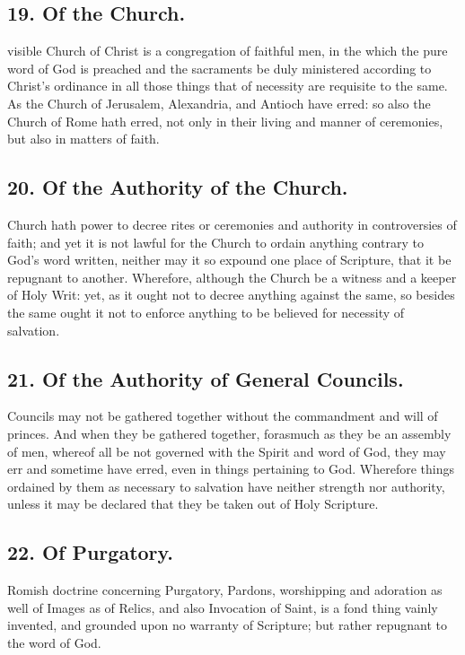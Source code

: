 \subsection{19. Of the Church.}
 visible Church of Christ is a congregation of faithful men, in the which the pure word of God is preached and the sacraments be duly ministered according to Christ's ordinance in all those things that of necessity are requisite to the same. As the Church of Jerusalem, Alexandria, and Antioch have erred: so also the Church of Rome hath erred, not only in their living and manner of ceremonies, but also in matters of faith.

\subsection{20. Of the Authority of the Church.}
 Church hath power to decree rites or ceremonies and authority in controversies of faith; and yet it is not lawful for the Church to ordain anything contrary to God's word written, neither may it so expound one place of Scripture, that it be repugnant to another. Wherefore, although the Church be a witness and a keeper of Holy Writ: yet, as it ought not to decree anything against the same, so besides the same ought it not to enforce anything to be believed for necessity of salvation.

\subsection{21. Of the Authority of General Councils.}
 Councils may not be gathered together without the commandment and will of princes. And when they be gathered together, forasmuch as they be an assembly of men, whereof all be not governed with the Spirit and word of God, they may err and sometime have erred, even in things pertaining to God. Wherefore things ordained by them as necessary to salvation have neither strength nor authority, unless it may be declared that they be taken out of Holy Scripture.

\subsection{22. Of Purgatory.}
 Romish doctrine concerning Purgatory, Pardons, worshipping and adoration as well of Images as of Relics, and also Invocation of Saint, is a fond thing vainly invented, and grounded upon no warranty of Scripture; but rather repugnant to the word of God.

